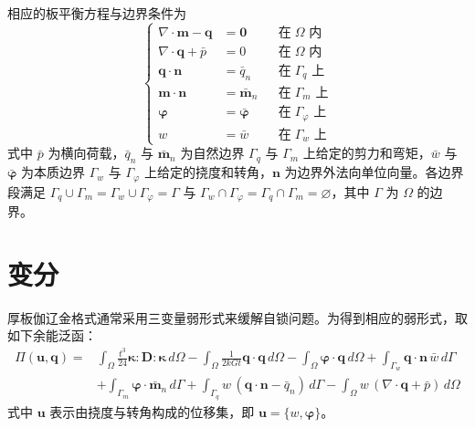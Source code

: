 \documentclass[internationalmaster]{hquThesis}
\begin{document}
相应的板平衡方程与边界条件为
\begin{equation}
    \left \{
    \begin{aligned}
        \nabla \cdot \boldsymbol m - \boldsymbol q &= \boldsymbol 0 & &\text{在}\; \Omega \text{ 内} \\
        \nabla \cdot \boldsymbol q + \bar p &= 0 & &\text{在}\; \Omega \text{ 内} \\
        \boldsymbol q \cdot \boldsymbol  n &= \bar q_n & &\text{在}\; \Gamma_q \text{ 上} \\
        \boldsymbol m \cdot \boldsymbol n &= \bar{\boldsymbol m}_n & &\text{在}\; \Gamma_m \text{ 上} \\
        \boldsymbol \varphi &= \bar{\boldsymbol \varphi} & &\text{在}\; \Gamma_\varphi \text{ 上} \\
        w &= \bar w & &\text{在}\; \Gamma_w \text{ 上}
    \end{aligned}
    \right .
    \label{eq:governing}
\end{equation}
式中 $\bar{p}$ 为横向荷载，$\bar{q}_n$ 与 $\bar{\boldsymbol m}_n$ 为自然边界 $\Gamma_q$ 与 $\Gamma_m$ 上给定的剪力和弯矩，$\bar{w}$ 与 $\bar{\boldsymbol\varphi}$ 为本质边界 $\Gamma_w$ 与 $\Gamma_\varphi$ 上给定的挠度和转角，$\boldsymbol n$ 为边界外法向单位向量。各边界段满足 $\Gamma_q\cup\Gamma_m=\Gamma_w\cup\Gamma_\varphi=\Gamma$ 与 $\Gamma_w\cap\Gamma_\varphi=\Gamma_q\cap\Gamma_m=\varnothing$，其中 $\Gamma$ 为 $\Omega$ 的边界。

\section{变分}

厚板伽辽金格式通常采用三变量弱形式来缓解自锁问题。为得到相应的弱形式，取如下余能泛函：
\begin{equation}
    \begin{aligned}
        \Pi(\boldsymbol u,\boldsymbol q) = &\int_\Omega \frac{t^3}{24}\boldsymbol\kappa:\boldsymbol D:\boldsymbol\kappa\,d\Omega
        -\int_\Omega \frac{1}{2kGt}\boldsymbol q\cdot\boldsymbol q\,d\Omega
        -\int_\Omega \boldsymbol\varphi\cdot\boldsymbol q\,d\Omega
        +\int_{\Gamma_w}\boldsymbol q\cdot\boldsymbol n\,\bar{w}\,d\Gamma\\
        &+\int_{\Gamma_m}\boldsymbol\varphi\cdot\bar{\boldsymbol m}_n\,d\Gamma
        +\int_{\Gamma_q} w\,(\boldsymbol q\cdot\boldsymbol n-\bar{q}_n)\,d\Gamma
        -\int_\Omega w\,(\nabla\cdot\boldsymbol q+\bar{p})\,d\Omega
    \end{aligned}
    \label{eq:functional}
\end{equation}
式中 $\boldsymbol u$ 表示由挠度与转角构成的位移集，即 $\boldsymbol u=\{w,\boldsymbol\varphi\}$。
\end{document}
